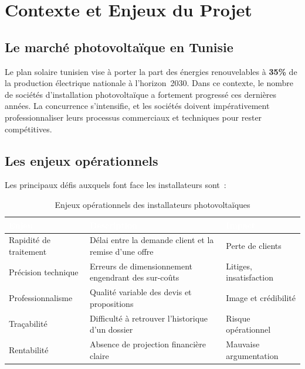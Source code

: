 \section{Contexte et Enjeux du Projet}

\subsection{Le marché photovoltaïque en Tunisie}

Le plan solaire tunisien vise à porter la part des énergies renouvelables à
\textbf{35\%} de la production électrique nationale à l'horizon~2030. Dans ce
contexte, le nombre de sociétés d'installation photovoltaïque a fortement
progressé ces dernières années. La concurrence s'intensifie, et les sociétés
doivent impérativement professionnaliser leurs processus commerciaux et
techniques pour rester compétitives.

\subsection{Les enjeux opérationnels}

Les principaux défis auxquels font face les installateurs sont~:

\begin{table}[H]
  \caption{Enjeux opérationnels des installateurs photovoltaïques}
  \label{tab:enjeux}
  \centering
  \begin{tabularx}{\textwidth}{L{3.5cm} X L{3cm}}
    \toprule
    \textcolor{white}{\textbf{Enjeu}} &
    \textcolor{white}{\textbf{Description}} &
    \textcolor{white}{\textbf{Impact}} \\
    \midrule
    Rapidité de traitement & Délai entre la demande client et la remise d'une offre & Perte de clients \\
    \addlinespace
    Précision technique & Erreurs de dimensionnement engendrant des sur-coûts & Litiges, insatisfaction \\
    \addlinespace
    Professionnalisme & Qualité variable des devis et propositions & Image et crédibilité \\
    \addlinespace
    Traçabilité & Difficulté à retrouver l'historique d'un dossier & Risque opérationnel \\
    \addlinespace
    Rentabilité & Absence de projection financière claire & Mauvaise argumentation \\
    \bottomrule
  \end{tabularx}
\end{table}

